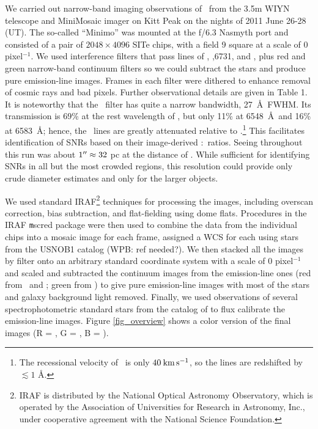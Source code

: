 We carried out narrow-band imaging observations of \gal\ from the 3.5m WIYN telescope and MiniMosaic imager on Kitt Peak on the nights of 2011 June 26-28 (UT).  The so-called ``Minimo'' was mounted at the f/6.3 Nasmyth port and consisted of a pair of $2048\times4096$ SITe chips, with a field  9 square at a scale of 0 pixel$^{-1}$.  We used interference filters that pass lines of \ha, \sii {},6731, and \oiii {}, plus red and green narrow-band continuum filters so we could subtract the stars and produce pure emission-line images. Frames in each filter were dithered to enhance removal of cosmic rays and bad pixels.  Further observational details are given in Table 1.  It is noteworthy that the \ha\ filter has quite a narrow bandwidth, 27\ \AA\ FWHM. Its transmission is 69\% at the rest wavelength of \ha, but only 11\% at 6548\ \AA\ and 16\% at 6583\ \AA; hence, the \nii\ lines are greatly attenuated relative to \ha.\footnote{The recessional velocity of \gal\ is only $40 \:\rm{km\,s^{-1}}$, so the lines are redshifted by $\lesssim 1$ \AA.}  This facilitates identification of SNRs based on their image-derived \sii:\ha\ ratios.  Seeing throughout this run was about $1\mbox{$^{\prime\prime}$} \approx 32$ pc at the distance of \gal.  While sufficient for identifying SNRs in all but the most crowded regions, this resolution could provide only crude diameter estimates and only for the larger objects.  


We used standard IRAF\footnote{IRAF is distributed by the National Optical Astronomy Observatory, which is operated by the Association of Universities for Research in Astronomy, Inc., under cooperative agreement with the National Science Foundation.} techniques for processing the images, including overscan correction, bias subtraction, and flat-fielding using dome flats.  Procedures in the IRAF {\texttt mscred} package were then used to combine the data from the individual chips into a mosaic image for each frame, assigned a WCS for each using stars from the USNOB1 catalog (WPB: ref needed?).  We then stacked  all the images by filter onto an arbitrary standard coordinate system with a scale of 0 pixel$^{-1}$ and scaled and subtracted the continuum images from the emission-line ones (red from \ha\ and \sii; green from \oiii) to give pure emission-line images with most of the stars and galaxy background light removed.  Finally, we used observations of several spectrophotometric standard stars from the catalog of \citet{massey88} to flux calibrate the emission-line images.  Figure \ref{fig_overview} shows a color version of the final images (R = \ha, G = \sii, B = \oiii).

